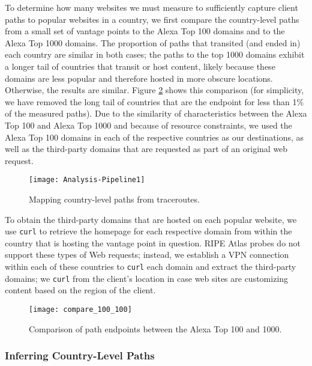 To determine how many websites we must measure to sufficiently capture client 
paths to popular websites in a country, we first compare the country-level paths from a small set of vantage 
points to the Alexa Top 100 domains 
 and to the Alexa Top 1000 domains.  The proportion of paths that transited (and
ended in) each country are similar in both cases; the paths to the top 1000
domains exhibit a longer tail of countries that transit or host content,
likely because these domains are less popular and therefore hosted in more
obscure locations. Otherwise, the results are similar. Figure \ref{fig:compare_alexas} 
shows this comparison (for simplicity, we have 
removed the long tail of countries that are the endpoint for less than 1\% of the measured paths).  Due to the similarity of characteristics between 
the Alexa Top 100 and Alexa Top 1000 and because of resource constraints, we used the Alexa Top 100 
domains in each of the respective countries as our destinations, as well as the third-party 
domains that are requested as part of an original web request. 

\begin{figure}[t]
\centering
\texttt{[image: Analysis-Pipeline1]}
\caption{Mapping country-level paths from traceroutes.}
\label{fig:analysis_pipeline}
\end{figure}

To obtain the third-party domains that are hosted on each popular website, we
use {\tt curl} to retrieve the homepage for each respective domain from within
the country that is hosting the vantage point in question.  RIPE Atlas probes
do not support these types of Web requests; instead, we establish a VPN
connection within each of these countries to {\tt curl} each domain and
extract the third-party domains; we {\tt curl} from the client's location in
case web sites are customizing content based on the region of the client.

\begin{figure}[t]
\centering
\texttt{[image: compare\_100\_100]}
\caption{Comparison of path endpoints between the Alexa Top 100 and 1000.}
\label{fig:compare_alexas}
\end{figure}

\subsubsection{Inferring Country-Level Paths}
\label{c_map}

